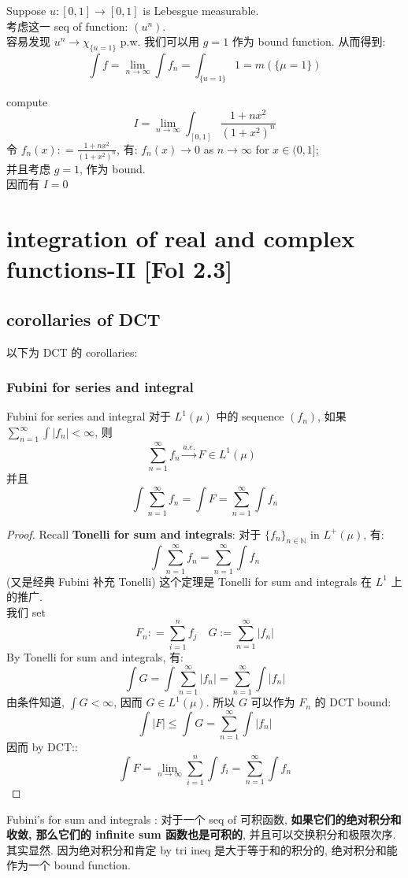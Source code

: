 \documentclass[lang=cn,11pt]{elegantbook}
\begin{document}
\begin{example}
    Suppose $u:[0,1] \to [0,1]$ is Lebesgue measurable. \\
    考虑这一 seq of function: $( u^n)$.\\
    容易发现 $u^n \rightarrow \chi_{\{u = 1\}}$ p.w.
    我们可以用 $g = 1$ 作为 bound function. 从而得到: \[
\int f=    \lim_{n\to\infty} \int f_n = \int_{\{u=1\}}1 = m(\{\mu =1 \})
    \]
\end{example}


\begin{example}
    compute \[
    I = \lim_{n\to \infty} \int_{[0,1]} \frac{1 + n x^2}{(1+ x^2)^n}
    \]
令 $f_n(x) : = \frac{1 + n x^2}{(1+ x^2)^n}$, 有: $f_n(x) \to 0$ as $n\to \infty$ for $x \in (0,1]$;\\
并且考虑 $g=1$, 作为 bound.\\
因而有 $I = 0$
\end{example}


\chapter{integration of real and complex functions-II [Fol 2.3]}
\section{corollaries of DCT}
以下为 DCT 的 corollaries:

\subsection{Fubini for series and integral}
\begin{corollary}{Fubini for series and integral}
对于 $L^1(\mu)$ 中的 sequence $(f_n)$,  如果 $\sum_{n=1}^\infty \int |f_n| < \infty$, 则 $$\sum_{n=1}^\infty f_n   \overset{a.e.}{\to}  F\in L^1(\mu) \;\;$$ 并且 \[  \int \sum_{n=1}^\infty f_n 
 =    \int F = \sum_{n=1}^\infty \int f_n\]
\end{corollary}
\begin{proof}
Recall \textbf{Tonelli for sum and integrals}: 对于 $\{f_n\}_{n\in\mathbb{N}}$ in $L^+(\mu)$, 有:
$$
\int \sum_{n=1}^\infty f_n = \sum_{n=1}^\infty \int f_n
$$
(又是经典 Fubini 补充 Tonelli) 这个定理是 Tonelli for sum and integrals 在 $L^1$ 上的推广.\\
我们 set \[
F_n : = \sum_{i=1}^n f_j\quad G:= \sum_{n=1}^\infty  |f_n|
\]
By Tonelli for sum and integrals, 有: \[
\int G = \int \sum_{n=1}^\infty  |f_n| =  \sum_{n=1}^\infty \int  |f_n| 
\]
由条件知道, $\int G < \infty$, 因而 $G \in L^1(\mu)$.
所以 $G$ 可以作为 $F_n $ 的 DCT bound: \[
\int |F| \leq \int G = \sum_{n=1}^\infty \int  |f_n| 
\] 因而 by DCT:: \[
\int F = \lim_{n\to \infty } \sum_{i=1}^n \int f_i =  \sum_{n=1}^\infty \int f_n
\]
\end{proof}
\begin{remark}
    Fubini's for sum and integrals : 对于一个 seq of 可积函数, \textbf{如果它们的绝对积分和收敛, 那么它们的 infinite sum 函数也是可积的}, 并且可以交换积分和极限次序. \\
    其实显然. 因为绝对积分和肯定 by tri ineq 是大于等于和的积分的, 绝对积分和能作为一个 bound function.
\end{remark}
\end{document}
